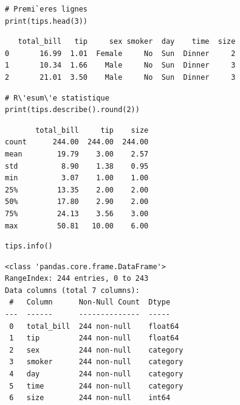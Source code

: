 \begin{codeblock}[title=\textbf{Python}]
\begin{verbatim}
# Premi`eres lignes
print(tips.head(3))
\end{verbatim}
\end{codeblock}

\begin{codeoutput}
\begin{verbatim}
   total_bill   tip     sex smoker  day    time  size
0       16.99  1.01  Female     No  Sun  Dinner     2
1       10.34  1.66    Male     No  Sun  Dinner     3
2       21.01  3.50    Male     No  Sun  Dinner     3
\end{verbatim}
\end{codeoutput}

\begin{codeblock}[title=\textbf{Python}]
\begin{verbatim}
# R\'esum\'e statistique
print(tips.describe().round(2))
\end{verbatim}
\end{codeblock}

\begin{codeoutput}
\begin{verbatim}
       total_bill     tip    size
count      244.00  244.00  244.00
mean        19.79    3.00    2.57
std          8.90    1.38    0.95
min          3.07    1.00    1.00
25%         13.35    2.00    2.00
50%         17.80    2.90    2.00
75%         24.13    3.56    3.00
max         50.81   10.00    6.00
\end{verbatim}
\end{codeoutput}

\begin{codeblock}[title=\textbf{Python}]
\begin{verbatim}
tips.info()
\end{verbatim}
\end{codeblock}

\begin{codeoutput}
\begin{verbatim}
<class 'pandas.core.frame.DataFrame'>
RangeIndex: 244 entries, 0 to 243
Data columns (total 7 columns):
 #   Column      Non-Null Count  Dtype
---  ------      --------------  -----
 0   total_bill  244 non-null    float64
 1   tip         244 non-null    float64
 2   sex         244 non-null    category
 3   smoker      244 non-null    category
 4   day         244 non-null    category
 5   time        244 non-null    category
 6   size        244 non-null    int64
\end{verbatim}
\end{codeoutput}

